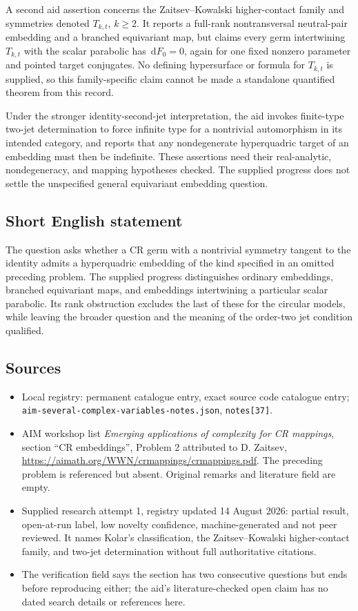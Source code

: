 \documentclass[11pt]{article}
\newcommand{\dd}{\,\mathrm{d}}
\begin{document}
A second aid assertion concerns the Zaitsev--Kowalski higher-contact family and symmetries denoted $T_{k,t}$, $k\geq2$. It reports a full-rank nontransversal neutral-pair embedding and a branched equivariant map, but claims every germ intertwining $T_{k,t}$ with the scalar parabolic has $\dd F_0=0$, again for one fixed nonzero parameter and pointed target conjugates. No defining hypersurface or formula for $T_{k,t}$ is supplied, so this family-specific claim cannot be made a standalone quantified theorem from this record.

Under the stronger identity-second-jet interpretation, the aid invokes finite-type two-jet determination to force infinite type for a nontrivial automorphism in its intended category, and reports that any nondegenerate hyperquadric target of an embedding must then be indefinite. These assertions need their real-analytic, nondegeneracy, and mapping hypotheses checked. The supplied progress does not settle the unspecified general equivariant embedding question.
\subsection{Short English statement}
The question asks whether a CR germ with a nontrivial symmetry tangent to the identity admits a hyperquadric embedding of the kind specified in an omitted preceding problem. The supplied progress distinguishes ordinary embeddings, branched equivariant maps, and embeddings intertwining a particular scalar parabolic. Its rank obstruction excludes the last of these for the circular models, while leaving the broader question and the meaning of the order-two jet condition qualified.
\subsection{Sources}
\begin{itemize}
\item Local registry: permanent catalogue entry, exact source code catalogue entry; \texttt{aim-several-complex-variables-notes.json}, \texttt{notes[37]}.
\item AIM workshop list \emph{Emerging applications of complexity for CR mappings}, section ``CR embeddings'', Problem 2 attributed to D. Zaitsev, \url{https://aimath.org/WWN/crmappings/crmappings.pdf}. The preceding problem is referenced but absent. Original remarks and literature field are empty.
\item Supplied research attempt 1, registry updated 14 August 2026: partial result, open-at-run label, low novelty confidence, machine-generated and not peer reviewed. It names Kolar's classification, the Zaitsev--Kowalski higher-contact family, and two-jet determination without full authoritative citations.
\item The verification field says the section has two consecutive questions but ends before reproducing either; the aid's literature-checked open claim has no dated search details or references here.
\end{itemize}
\end{document}
